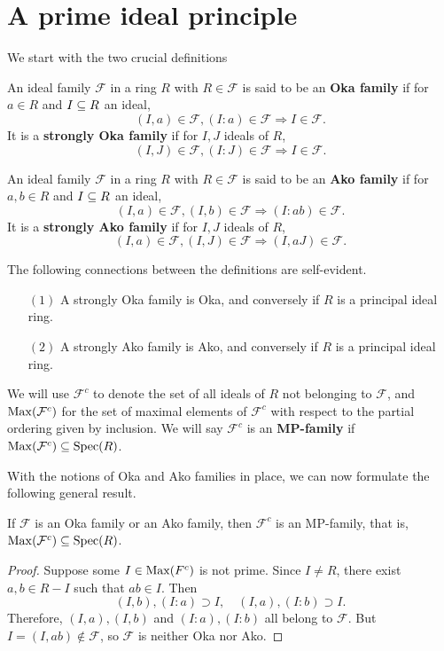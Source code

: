 \section{A prime ideal principle}
We start with the two crucial definitions
\begin{definition}
An ideal family $\mathcal{F}$ in a ring $R$ with $R\in\mathscr{F}$ is said to be an \textbf{Oka family} if for $a\in R$ and $I\subseteq R$ an ideal, 
\[(I,a)\in\mathcal{F},(I:a)\in\mathcal{F}\Rightarrow I\in\mathcal{F}.\]
It is a \textbf{strongly Oka family} if for $I,J$ ideals of $R$,
\[(I,J)\in\mathcal{F},(I:J)\in\mathcal{F}\Rightarrow I\in\mathcal{F}.\]
\end{definition}
\begin{definition}
An ideal family $\mathcal{F}$ in a ring $R$ with $R\in\mathcal{F}$ is said to be an \textbf{Ako family} if for $a,b\in R$ and $I\subseteq R$ an ideal,
\[(I,a)\in\mathcal{F},(I,b)\in\mathcal{F}\Rightarrow (I:ab)\in\mathcal{F}.\]
It is a \textbf{strongly Ako family} if for $I,J$ ideals of $R$,
\[(I,a)\in\mathcal{F},(I,J)\in\mathcal{F}\Rightarrow(I,aJ)\in\mathcal{F}.\]
\end{definition}
The following connections between the definitions are self-evident.
\begin{proposition}
\mbox{}
\begin{itemize}
\item[$(1)$] A strongly Oka family is Oka, and conversely if $R$ is a principal ideal ring.
\item[$(2)$] A strongly Ako family is Ako, and conversely if $R$ is a principal ideal ring.
\end{itemize}
\end{proposition}
We will use $\mathcal{F}^c$ to denote the set of all ideals of $R$ not belonging to $\mathcal{F}$, and $\mathrm{Max}(\mathcal{F}^c)$ for the set of maximal elements of $\mathcal{F}^c$ with respect to the partial ordering given by inclusion. We will say $\mathcal{F}^c$ is an \textbf{MP-family} if $\mathrm{Max}(\mathcal{F}^c)\subseteq\mathrm{Spec}(R)$.\par
With the notions of Oka and Ako families in place, we can now formulate the following general result.
\begin{theorem}\label{Oka Ako is MP}
If $\mathcal{F}$ is an Oka family or an Ako family, then $\mathcal{F}^c$ is an MP-family, that is, $\mathrm{Max}(\mathcal{F}^c)\subseteq\mathrm{Spec}(R)$.
\end{theorem}
\begin{proof}
Suppose some $I\in\mathrm{Max}(F^c)$ is not prime. Since $I\neq R$, there exist $a,b\in R- I$ such that $ab\in I$. Then 
\[(I,b),(I:a)\supset I,\quad (I,a),(I:b)\supset I.\]
Therefore, $(I,a),(I,b)$ and $(I:a),(I:b)$ all belong to $\mathscr{F}$. But $I=(I,ab)\notin\mathcal{F}$, so $\mathcal{F}$ is neither Oka nor Ako.
\end{proof}
